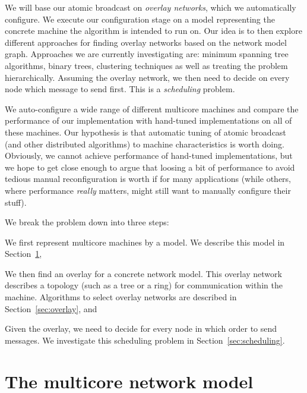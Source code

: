 \documentclass{article}
\begin{document}
We will base our atomic broadcast on \emph{overlay networks}, which we
automatically configure. We execute our configuration stage on a model
representing the concrete machine the algorithm is intended to run
on. %
Our idea is to then explore different approaches for finding overlay
networks based on the network model graph. Approaches we are currently
investigating are: minimum spanning tree algorithms, binary trees,
clustering techniques as well as treating the problem
hierarchically. Assuming the overlay network, we then need to decide
on every node which message to send first. This is a \emph{scheduling}
problem.

We auto-configure a wide range of different multicore machines and
compare the performance of our implementation with hand-tuned
implementations on all of these machines.
Our hypothesis is that automatic tuning of atomic broadcast (and other
distributed algorithms) to machine characteristics is worth
doing. Obviously, we cannot achieve performance of hand-tuned
implementations, but we hope to get close enough to argue that loosing
a bit of performance to avoid tedious manual reconfiguration is worth
if for many applications (while others, where performance
\emph{really} matters, might still want to manually configure their
stuff).

We break the problem down into three steps:
\begin{inparaenum}[\itshape 1\upshape)]
\item We first represent multicore machines by a model. We describe
  this model in Section~\ref{sec:model},
\item We then find an overlay for a concrete network model. This
  overlay network describes a topology (such as a tree or a ring) for
  communication within the machine. Algorithms to select overlay
  networks are described in Section~\ref{sec:overlay}, and
\item Given the overlay, we need to decide for every node in which
  order to send messages. We investigate this scheduling problem in
  Section~\ref{sec:scheduling}.
\end{inparaenum}

\section{The multicore network model}
\label{sec:model}
\end{document}

